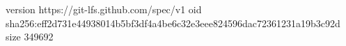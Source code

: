 version https://git-lfs.github.com/spec/v1
oid sha256:eff2d731e44938014b5bf3df4a4be6c32e3eee824596dac72361231a19b3c92d
size 349692
